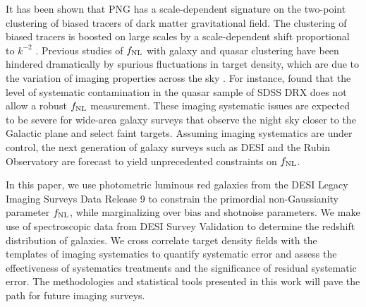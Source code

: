 It has been shown that PNG has a scale-dependent signature on the two-point clustering of biased tracers of dark matter gravitational field. The clustering of biased tracers is boosted on large scales by a scale-dependent shift proportional to $k^{-2}$ \citep[see,][]{dalal2008imprints}. Previous studies of $f_{\rm NL}$ with galaxy and quasar clustering have been hindered dramatically by spurious fluctuations in target density, which are due to the variation of imaging properties across the sky \citep{Ho2015JCAP...05..040H}. For instance, \cite{pullen2013systematic} found that the level of systematic contamination in the quasar sample of SDSS DRX does not allow a robust $f_{\rm NL}$ measurement. These imaging systematic issues are expected to be severe for wide-area galaxy surveys that observe the night sky closer to the Galactic plane and select faint targets. Assuming imaging systematics are under control, the next generation of galaxy surveys such as DESI and the Rubin Observatory are forecast to yield unprecedented constraints on $f_{\rm NL}$.

In this paper, we use photometric luminous red galaxies from the DESI Legacy Imaging Surveys Data Release 9 to constrain the primordial non-Gaussianity parameter $f_{\rm NL}$, while marginalizing over bias and shotnoise parameters. We make use of spectroscopic data from DESI Survey Validation to determine the redshift distribution of galaxies. We cross correlate target density fields with the templates of imaging systematics to quantify systematic error and assess the effectiveness of systematics treatments and the significance of residual systematic error. The methodologies and statistical tools presented in this work will pave the path for future imaging surveys. 